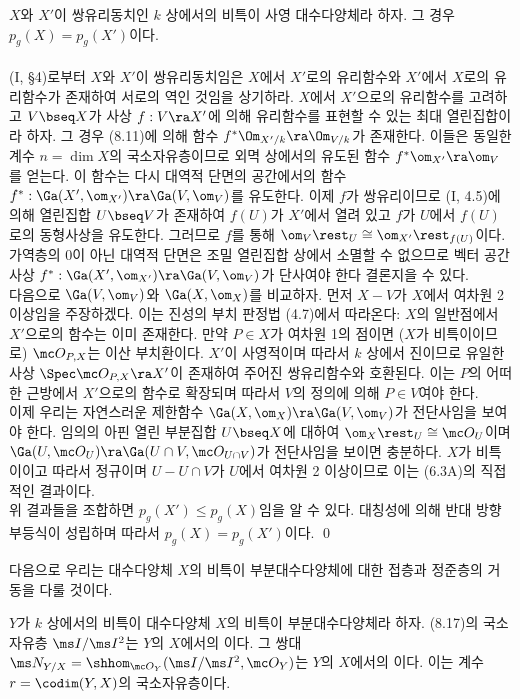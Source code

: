 	
	\begin{theorem}
	$X$와 $X'$이 쌍유리동치인 $k$ 상에서의 비특이 사영 대수다양체라 하자. 그 경우 $p_g(X)=p_g(X')$이다.\\\\
	\pf (I, \S 4)로부터 $X$와 $X'$이 쌍유리동치임은 $X$에서 $X'$로의 유리함수와
	$X'$에서 $X$로의 유리함수가 존재하여 서로의 역인 것임을 상기하라.
	$X$에서 $X'$으로의 유리함수를 고려하고 $V\bseq X$가 사상 $f:V\ra X'$에 의해 유리함수를 표현할 수 있는 최대 열린집합이라 하자.
	그 경우 (8.11)에 의해 함수 $f^*\Om_{X'/k}\ra\Om_{V/k}$가 존재한다.
	이들은 동일한 계수 $n=\dim X$의 국소자유층이므로 외멱 상에서의 유도된 함수 $f^*\om_{X'}\ra\om_V$를 얻는다.
	이 함수는 다시 대역적 단면의 공간에서의 함수 $f^*:\Ga(X',\om_{X'})\ra\Ga(V,\om_V)$를 유도한다.
	이제 $f$가 쌍유리이므로 (I, 4.5)에 의해 열린집합 $U\bseq V$가 존재하여
	$f(U)$가 $X'$에서 열려 있고 $f$가 $U$에서 $f(U)$로의 동형사상을 유도한다.
	그러므로 $f$를 통해 $\om_V\rest_U\cong\om_{X'}\rest_{f(U)}$이다.
	가역층의 0이 아닌 대역적 단면은 조밀 열린집합 상에서 소멸할 수 없으므로
	벡터 공간 사상 $f^*:\Ga(X',\om_{X'})\ra\Ga(V,\om_V)$가 단사여야 한다 결론지을 수 있다.\\
	다음으로 $\Ga(V,\om_V)$와 $\Ga(X,\om_X)$를 비교하자. 먼저 $X-V$가 $X$에서 여차원 2 이상임을 주장하겠다.
	이는 진성의 부치 판정법 (4.7)에서 따라온다:
	$X$의 일반점에서 $X'$으로의 함수는 이미 존재한다.
	만약 $P\in X$가 여차원 1의 점이면 ($X$가 비특이이므로) $\mc O_{P,X}$는 이산 부치환이다.
	$X'$이 사영적이며 따라서 $k$ 상에서 진이므로 유일한 사상 $\Spec\mc O_{P,X}\ra X'$이 존재하여 주어진 쌍유리함수와 호환된다.
	이는 $P$의 어떠한 근방에서 $X'$으로의 함수로 확장되며 따라서 $V$의 정의에 의해 $P\in V$여야 한다.\\
	이제 우리는 자연스러운 제한함수 $\Ga(X,\om_X)\ra\Ga(V,\om_V)$가 전단사임을 보여야 한다.
	임의의 아핀 열린 부분집합 $U\bseq X$에 대하여 $\om_X\rest_U\cong\mc O_U$이며
	$\Ga(U,\mc O_U)\ra\Ga(U\cap V,\mc O_{U\cap V})$가 전단사임을 보이면 충분하다.
	$X$가 비특이이고 따라서 정규이며 $U-U\cap V$가 $U$에서 여차원 2 이상이므로 이는 (6.3A)의 직접적인 결과이다.\\
	위 결과들을 조합하면 $p_g(X')\le p_g(X)$임을 알 수 있다. 대칭성에 의해 반대 방향 부등식이 성립하며 따라서 $p_g(X)=p_g(X')$이다.
	\qed
	\end{theorem}
	
	다음으로 우리는 대수다양체 $X$의 비특이 부분대수다양체에 대한 접층과 정준층의 거동을 다룰 것이다.
	
	
	\begin{definition}
	$Y$가 $k$ 상에서의 비특이 대수다양체 $X$의 비특이 부분대수다양체라 하자.
	(8.17)의 국소자유층 $\ms I/\ms I^2$는 $Y$의 $X$에서의 이다.
	그 쌍대 $\ms N_{Y/X}=\shhom_{\mc O_Y}(\ms I/\ms I^2,\mc O_Y)$는 $Y$의 $X$에서의 이다.
	이는 계수 $r=\codim(Y,X)$의 국소자유층이다.
	\end{definition}
	
